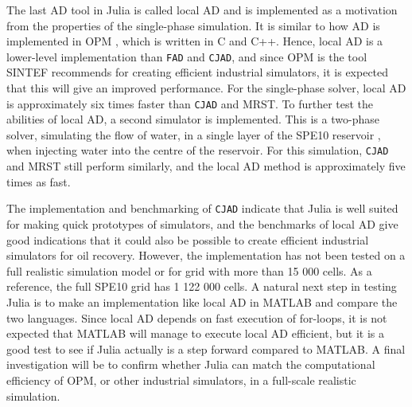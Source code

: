 The last AD tool in Julia is called local AD and is implemented as a motivation from the properties of the single-phase simulation. It is similar to how AD is implemented in OPM \emph{\citep{OPM}}, which is written in C and C++. Hence, local AD is a lower-level implementation than \texttt{FAD} and \texttt{CJAD}, and since OPM is the tool SINTEF recommends for creating efficient industrial simulators, it is expected that this will give an improved performance. For the single-phase solver, local AD is approximately six times faster than \texttt{CJAD} and MRST. To further test the abilities of local AD, a second simulator is implemented. This is a two-phase solver, simulating the flow of water, in a single layer of the SPE10 reservoir \emph{\citep{SPE10}}, when injecting water into the centre of the reservoir. For this simulation, \texttt{CJAD} and MRST still perform similarly, and the local AD method is approximately five times as fast.

The implementation and benchmarking of \texttt{CJAD} indicate that Julia is well suited for making quick prototypes of simulators, and the benchmarks of local AD give good indications that it could also be possible to create efficient industrial simulators for oil recovery. However, the implementation has not been tested on a full realistic simulation model or for grid with more than 15 000 cells. As a reference, the full SPE10 grid has 1 122 000 cells. A natural next step in testing Julia is to make an implementation like local AD in MATLAB and compare the two languages. Since local AD depends on fast execution of for-loops, it is not expected that MATLAB will manage to execute local AD efficient, but it is a good test to see if Julia actually is a step forward compared to MATLAB. A final investigation will be to confirm whether Julia can match the computational efficiency of OPM, or other industrial simulators, in a full-scale realistic simulation. 